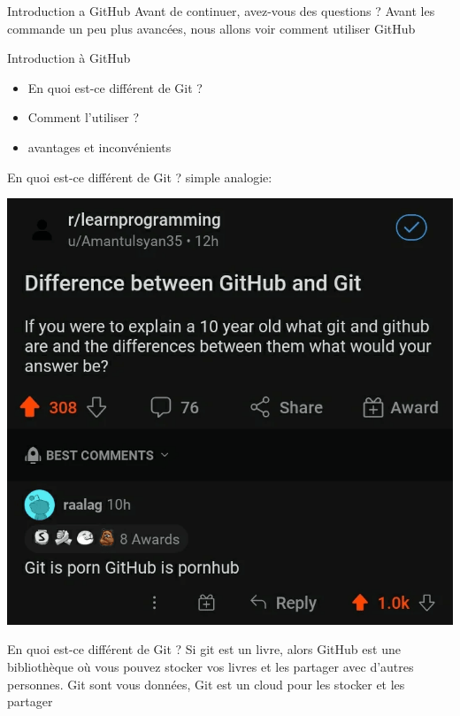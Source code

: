 \documentclass[usenames,dvipsnames]{beamer}
\begin{document}
\begin{frame}[fragile]{Introduction a GitHub}
	Avant de continuer, avez-vous des questions ?
	\pause
	\vspace{2cm}
	Avant les commande un peu plus avancées, nous allons voir comment utiliser GitHub
\end{frame}



\begin{frame}[fragile]{Introduction à GitHub}
	\begin{itemize}
		\item En quoi est-ce différent de Git ?
		\item Comment l'utiliser ?
		\item avantages et inconvénients
	\end{itemize}
\end{frame}

\begin{frame}[fragile]{En quoi est-ce différent de Git ?}
	simple analogie:
	\begin{center}
		\includegraphics[width=0.70\linewidth]{Im/git_porn.png}
	\end{center}
\end{frame}
\begin{frame}[fragile]{En quoi est-ce différent de Git ?}
	Si git est un livre, alors GitHub est une bibliothèque où vous pouvez stocker vos livres et les partager avec d'autres personnes.
	\vspace{2cm}
	Git sont vous données, Git est un cloud pour les stocker et les partager
\end{frame}
\end{document}

